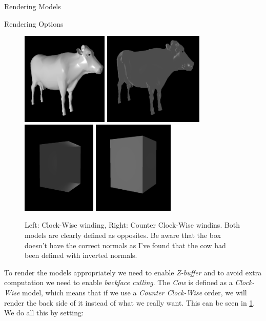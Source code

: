 \documentclass{article}
\begin{document}
\begin{multicols}{2}
\begin{section}{Rendering Models}
\begin{subsection}{Rendering Options}
  \begin{figure}[H]
    \centering
    \includegraphics[width=0.45\linewidth, height=12em]{./res/CW-cow.png}
    \includegraphics[width=0.45\linewidth, height=12em]{./res/CCW-cow.png}
    \includegraphics[width=0.45\linewidth, height=12em]{./res/CW-cube.png}
    \includegraphics[width=0.45\linewidth, height=12em]{./res/CCW-cube.png}
    \caption{Left: Clock-Wise winding, Right: Counter Clock-Wise windins. Both
models are clearly defined as opposites. Be aware that the box doesn't have the
correct normals as I've found that the cow had been defined with inverted
normals.}
    \label{fig:wind}
  \end{figure}

    To render the models appropriately we need to enable \textit{Z-buffer} and
to avoid extra computation we need to enable \textit{backface culling}. The
\textit{Cow} is defined as a \textit{Clock-Wise} model, which means that if we
use a \textit{Counter Clock-Wise} order, we will render the back side of it
instead of what we really want. This can be seen in \cref{fig:wind}. We do all
this by setting:


\end{subsection}
\end{section}
\end{multicols}
\end{document}
